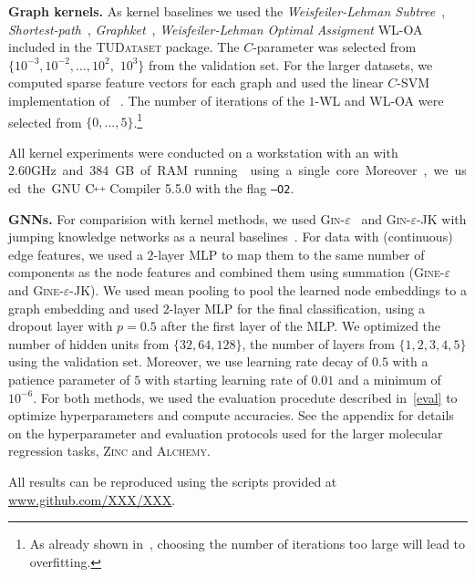 \documentclass{article}
\newcommand{\xhdr}[1]{{\noindent\bfseries #1}}
\theoremstyle{definition}
\newcommand{\CC}[1][]{$\text{C\hspace{-.25ex}}^{_{_{_{++}}}}
	\ifthenelse{\equal{#1}{}}{}{\text{\hspace{-.625ex}#1}}$}
\newcommand{\new}[1]{\emph{#1}}
\begin{document}
\xhdr{Graph kernels.} As kernel baselines we used the \new{Weisfeiler-Lehman Subtree}~\cite{She+2011}, \new{Shortest-path}~\cite{Bor+2005}, \new{Graphket}~\cite{She+2009}, \new{Weisfeiler-Lehman Optimal Assigment} \textsc{WL-OA}~\cite{Kri+2016} included in the \textsc{TUDataset} package. The $C$-parameter was selected from $\{10^{-3}, 10^{-2}, \dotsc, 10^{2},$ $10^{3}\}$ from the validation set. For the larger datasets, we computed sparse feature vectors for each graph and used the linear $C$-SVM implementation of ~\cite{Fan+2008}. The number of iterations of the \textsc{$1$-WL} and \textsc{WL-OA} were selected from $\{0,\dotsc,5\}$.\footnote{As already shown in~\cite{She+2011}, choosing the number of iterations too large will lead to overfitting.}

All kernel experiments were conducted on a workstation with an  with 2.60\si GHz and 384\si GB of RAM running  using a single core. Moreover, we used the GNU \CC Compiler 5.5.0 with the flag \texttt{--O2}. 

\xhdr{GNNs.} 
For comparision with kernel methods, we used \textsc{Gin-$\varepsilon$}~\cite{Xu+2018b} and \textsc{Gin-$\varepsilon$-JK} with jumping knowledge networks as a neural baselines~\cite{Xu+2018}. For data with (continuous) edge features, we used a $2$-layer MLP to map them to the same number of components as the node features and combined them using summation (\textsc{Gine-$\varepsilon$} and \textsc{Gine-$\varepsilon$}-JK). We used mean pooling to pool the learned node embeddings to a graph embedding and used $2$-layer MLP for the final classification, using a dropout layer with $p = 0.5$ after the first layer of the MLP. We optimized the number of hidden units from $
\{ 32, 64, 128\}$, the number of layers from $ \{1, 2, 3, 4, 5\}$ using the validation set. Moreover, we use learning rate decay of $0.5$ with a patience parameter of $5$ with starting learning rate of $0.01$ and a minimum of $10^{-6}$. For both methods, we used the evaluation procedute described in~\cref{eval} to optimize hyperparameters and compute accuracies. See the appendix for details on the hyperparameter and evaluation protocols used for the larger molecular regression tasks, \textsc{Zinc} and \textsc{Alchemy}.

All results can be reproduced using the scripts provided at \url{www.github.com/XXX/XXX}.
\end{document}
